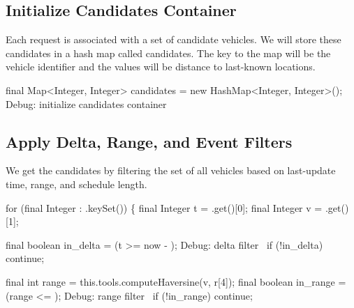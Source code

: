 \subsection{Initialize Candidates Container}

Each request is associated with a set of candidate vehicles. We will store
these candidates in a hash map called {\Tt{}candidates\nwendquote}. The key to the map will
be the vehicle identifier and the values will be distance to last-known
locations.

\nwenddocs{}\endmoddef\nwstartdeflinemarkup{}\nwenddeflinemarkup
final Map<Integer, Integer> candidates = new HashMap<Integer, Integer>();
\LA{}Debug: initialize candidates container~{\nwtagstyle{}}\RA{}
\nwendcode{}\nwdocspar

\subsection{Apply Delta, Range, and Event Filters}

We get the candidates by filtering the set of all vehicles based on last-update
time, range, and schedule length.

\nwenddocs{}\endmoddef\nwstartdeflinemarkup{}\nwenddeflinemarkup
for (final Integer  : .keySet()) \{
  final Integer t = .get()[0];
  final Integer v = .get()[1];

  final boolean in_delta = (t >= now - );
  \LA{}Debug: delta filter~{\nwtagstyle{}}\RA{}
  if (!in_delta)
    continue;

  final int range = this.tools.computeHaversine(v, r[4]);
  final boolean in_range = (range <= );
  \LA{}Debug: range filter~{\nwtagstyle{}}\RA{}
  if (!in_range)
    continue;

